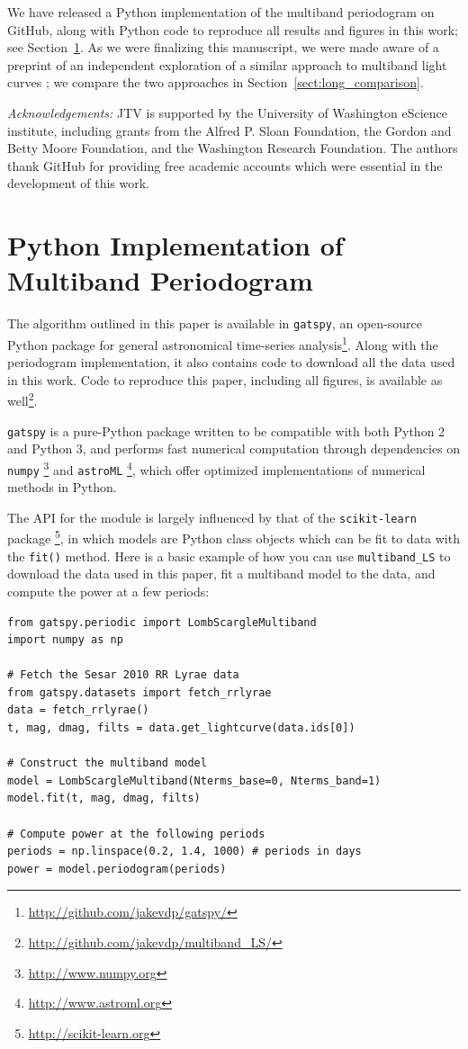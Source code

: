 \documentclass[12pt,preprint]{aastex}
\newcommand{\Sect}[1]{Section~\ref{sect:#1}}
\newcommand{\sect}[1]{\Sect{#1}}
\newcommand{\sectlabel}[1]{\label{sect:#1}}
\begin{document}
We have released a Python implementation of the multiband periodogram on GitHub, along with Python code to reproduce all results and figures in this work; see \sect{gatspy}.
As we were finalizing this manuscript, we were made aware of a preprint of an independent exploration of a similar approach to multiband light curves \citep{Long14}; we compare the two approaches in \sect{long_comparison}.

{\it Acknowledgements:} JTV is supported by the University of Washington eScience institute, including grants from the Alfred P. Sloan Foundation, the Gordon and Betty Moore Foundation, and the Washington Research Foundation. The authors thank GitHub for providing free academic accounts which were essential in the development of this work.





\appendix
\section{Python Implementation of Multiband Periodogram}
\sectlabel{gatspy}
The algorithm outlined in this paper is available in {\tt gatspy}, an open-source Python package for general astronomical time-series analysis\footnote{\url{http://github.com/jakevdp/gatspy/}}. Along with the periodogram implementation, it also contains code to download all the data used in this work. Code to reproduce this paper, including all figures, is available as well\footnote{\url{http://github.com/jakevdp/multiband_LS/}}.

{\tt gatspy} is a pure-Python package written to be compatible with both Python 2 and Python 3, and performs fast numerical computation through dependencies on {\tt numpy} \citep{numpy}\footnote{\url{http://www.numpy.org}} and {\tt astroML} \citep{astroML}\footnote{\url{http://www.astroml.org}}, which offer optimized implementations of numerical methods in Python.

The API for the module is largely influenced by that of the {\tt scikit-learn} package \citep{scikit-learn, sklearn_API}\footnote{\url{http://scikit-learn.org}}, in which models are Python class objects which can be fit to data with the \texttt{fit()} method.
Here is a basic example of how you can use {\tt multiband\_LS} to download the data used in this paper, fit a multiband model to the data, and compute the power at a few periods:

\begin{lstlisting}
from gatspy.periodic import LombScargleMultiband
import numpy as np

# Fetch the Sesar 2010 RR Lyrae data
from gatspy.datasets import fetch_rrlyrae
data = fetch_rrlyrae()
t, mag, dmag, filts = data.get_lightcurve(data.ids[0])

# Construct the multiband model
model = LombScargleMultiband(Nterms_base=0, Nterms_band=1)
model.fit(t, mag, dmag, filts)

# Compute power at the following periods
periods = np.linspace(0.2, 1.4, 1000) # periods in days
power = model.periodogram(periods)
\end{lstlisting}
\end{document}
